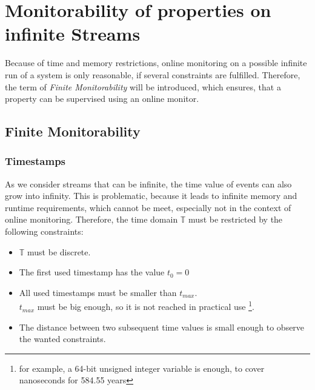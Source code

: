 
\chapter{Monitorability of properties on infinite Streams}
\label{chapter-monitorability}
	Because of time and memory restrictions, online monitoring on a possible infinite run of a system is only reasonable, if several constraints are fulfilled. Therefore, the term of \emph{Finite Monitorability} will be introduced, which ensures, that a property can be supervised using an online monitor.

\section{Finite Monitorability}
	\subsection{Timestamps}
		\label{monitorability_timestamps}
		As we consider streams that can be infinite, the time value of events can also grow into infinity. This is problematic, because it leads to infinite memory and runtime requirements, which cannot be meet, especially not in the context of online monitoring. Therefore, the time domain $\mathbb{T}$ must be restricted by the following constraints:
		\begin{itemize}
			\item
				$\mathbb{T}$ must be discrete.
			\item
				The first used timestamp has the value $t_0=0$
			\item
				All used timestamps must be smaller than $t_{max}$.\\
				$t_{max}$ must be big enough, so it is not reached in practical use \footnote{for example, a 64-bit unsigned integer variable is enough, to cover nanoseconds for 584.55 years}.
			\item
				The distance between two subsequent time values is small enough to observe the wanted constraints.
		\end{itemize}
